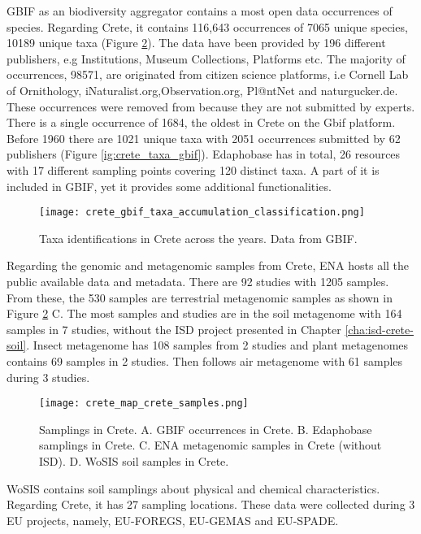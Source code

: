 GBIF as an biodiversity aggregator contains a most open data occurrences of species. 
Regarding Crete, it contains 116,643 occurrences of 7065 unique species,
10189 unique taxa (Figure \ref{fig:crete-samplings}). The data
have been provided by 196 different publishers, e.g Institutions, Museum Collections, Platforms etc.
The majority of occurrences, 98571, are originated from citizen science platforms, i.e 
Cornell Lab of Ornithology, iNaturalist.org,Observation.org, Pl@ntNet and naturgucker.de.
These occurrences were removed from because they are not submitted by experts.
There is a single occurrence of 1684, the oldest in Crete on the Gbif platform. Before 
1960 there are 1021 unique taxa with 2051 occurrences submitted by 62 publishers (Figure \ref{ig:crete_taxa_gbif}).
Edaphobase has in total, 26 resources with 17 different sampling points covering 120 distinct taxa.
A part of it is included in GBIF, yet it provides some additional functionalities. 

\begin{figure}[hbt!] 
    \centering\texttt{[image: crete\_gbif\_taxa\_accumulation\_classification.png]}
    \caption{Taxa identifications in Crete across the years. Data from GBIF.}
    \label{fig:crete_taxa_gbif}
\end{figure}

Regarding the genomic and metagenomic samples from Crete, ENA hosts all the public 
available data and metadata. There are 92 studies with 1205 samples.
From these, the 530 samples are terrestrial metagenomic samples as shown in
Figure \ref{fig:crete-samplings} C. 
The most samples and studies are in the soil metagenome with 164 samples in 7 studies, without the
ISD project presented in Chapter \ref{cha:isd-crete-soil}.
Insect metagenome has 108 samples from 2 studies
and plant metagenomes contains 69 samples in 2 studies.
Then follows air metagenome with 61 samples during 3 studies.

\begin{figure}[hbt!] 
    \centering\texttt{[image: crete\_map\_crete\_samples.png]}
    \caption[Samplings in Crete]{Samplings in Crete. A. GBIF occurrences in Crete.
    B. Edaphobase samplings in Crete. C. ENA metagenomic samples in Crete (without ISD). D. WoSIS soil samples in Crete.}
    \label{fig:crete-samplings}
\end{figure}

WoSIS contains soil samplings about physical and chemical characteristics. Regarding 
Crete, it has 27 sampling locations. These data were collected during 3 EU projects, namely,
EU-FOREGS, EU-GEMAS and EU-SPADE.

